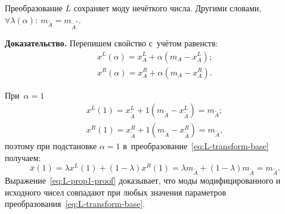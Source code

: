 \begin{prop}
\label{prop:L-prop1}
Преобразование $L$ сохраняет моду нечёткого числа. Другими словами, $\forall \lambda (\alpha ):\ m_{\tilde A}=m_{\tilde A^{*}}$.
\end{prop}
\textbf{Доказательство.} Перепишем свойство с~учётом равенств:
\begin{gather*}
  x^L(\alpha )=x_{A}^{L}+\alpha (m_A-x_{A}^{L}); \\ 
  x^R(\alpha )=x_{A}^{R}+\alpha (m_A-x_{A}^{R}).
\end{gather*}

При~$\alpha=1$ 
\begin{gather*}
  x^L(1)=x_{\tilde A}^{L}+1\left( m_{\tilde A}-x_{\tilde A}^{L} \right)=m_{\tilde A}; \\ 
  x^R(1)=x_{\tilde A}^{R}+1\left( m_{\tilde A}-x_{\tilde A}^{R} \right)=m_{\tilde A},
\end{gather*}
поэтому при подстановке $\alpha=1$ в~преобразование~\eqref{eq:L-transform-base} получаем:
\begin{equation}
\label{eq:L-prop1-proof}
  \bar{x}\left( 1 \right)=\lambda x^L\left( 1 \right)+\left( 1-\lambda  \right)x^R\left( 1 \right)=\lambda m_{\tilde A}+\left( 1-\lambda \right)m_{\tilde A}=m_{\tilde A}.
\end{equation}
Выражение~\eqref{eq:L-prop1-proof} доказывает, что моды модифицированного и исходного чисел совпадают при любых значения параметров преобразования~\eqref{eq:L-transform-base}.

